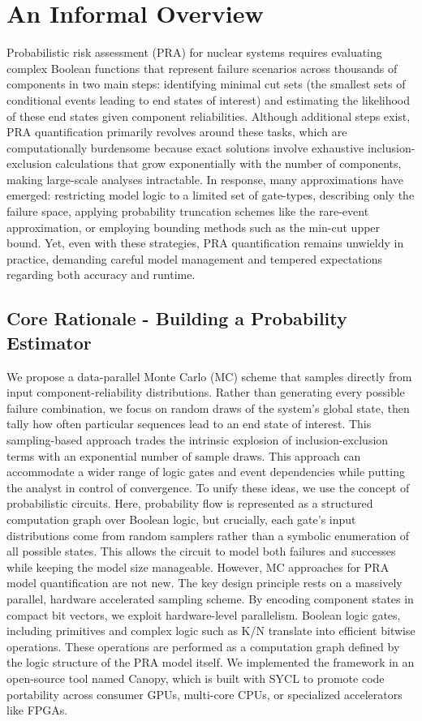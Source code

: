 
\section*{An Informal Overview}
Probabilistic risk assessment (PRA) for nuclear systems requires evaluating complex Boolean functions that represent failure scenarios across thousands of components in two main steps: identifying minimal cut sets (the smallest sets of conditional events leading to end states of interest) and estimating the likelihood of these end states given component reliabilities. Although additional steps exist, PRA quantification primarily revolves around these tasks, which are computationally burdensome because exact solutions involve exhaustive inclusion-exclusion calculations that grow exponentially with the number of components, making large-scale analyses intractable. In response, many approximations have emerged: restricting model logic to a limited set of gate-types, describing only the failure space, applying probability truncation schemes like the rare-event approximation, or employing bounding methods such as the min-cut upper bound. Yet, even with these strategies, PRA quantification remains unwieldy in practice, demanding careful model management and tempered expectations regarding both accuracy and runtime.
\subsection*{Core Rationale - Building a Probability Estimator}
We propose a data-parallel Monte Carlo (MC) scheme that samples directly from input component-reliability distributions. Rather than generating every possible failure combination, we focus on random draws of the system’s global state, then tally how often particular sequences lead to an end state of interest. This sampling-based approach trades the intrinsic explosion of inclusion-exclusion terms with an exponential number of sample draws. This approach can accommodate a wider range of logic gates and event dependencies while putting the analyst in control of convergence. To unify these ideas, we use the concept of probabilistic circuits. Here, probability flow is represented as a structured computation graph over Boolean logic, but crucially, each gate’s input distributions come from random samplers rather than a symbolic enumeration of all possible states. This allows the circuit to model both failures and successes while keeping the model size manageable. However, MC approaches for PRA model quantification are not new. The key design principle rests on a massively parallel, hardware accelerated sampling scheme. By encoding component states in compact bit vectors, we exploit hardware-level parallelism. Boolean logic gates, including primitives and complex logic such as K/N translate into efficient bitwise operations. These operations are performed as a computation graph defined by the logic structure of the PRA model itself. We implemented the framework in an open-source tool named Canopy, which is built with SYCL to promote code portability across consumer GPUs, multi-core CPUs, or specialized accelerators like FPGAs.

